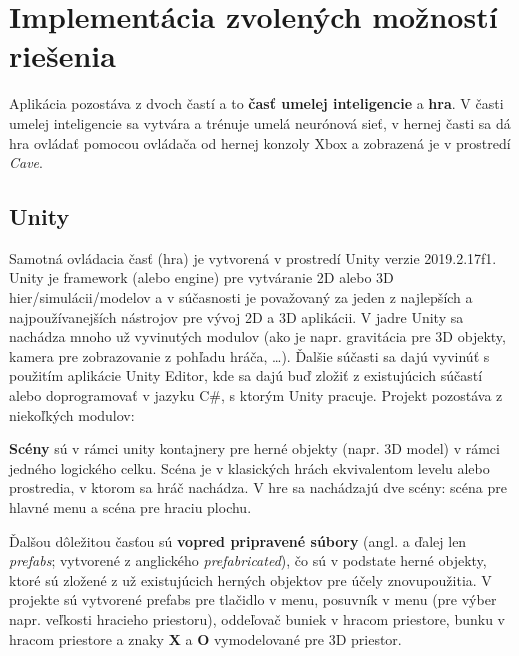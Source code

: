 \clearpage
\section{Implementácia zvolených možností riešenia}\label{sec:programming}

Aplikácia pozostáva z dvoch častí a to \textbf{časť umelej inteligencie} a \textbf{hra}.
V časti umelej inteligencie sa vytvára a trénuje umelá neurónová sieť, v hernej časti sa dá hra ovládať pomocou
ovládača od hernej konzoly Xbox a zobrazená je v prostredí \emph{Cave}.

\subsection{Unity}\label{subsec:unity}
Samotná ovládacia časť (hra) je vytvorená v prostredí Unity verzie 2019.2.17f1.
Unity je framework (alebo engine) pre vytváranie 2D alebo 3D hier/simulácii/modelov a v súčasnosti je považovaný za
jeden z najlepších a najpoužívanejších nástrojov pre vývoj 2D a 3D aplikácii.
V jadre Unity sa nachádza mnoho už vyvinutých modulov (ako je napr. gravitácia pre 3D objekty, kamera pre zobrazovanie
z pohľadu hráča, \dots).
Ďalšie súčasti sa dajú vyvinúť s použitím aplikácie Unity Editor, kde sa dajú buď zložiť z existujúcich súčastí
alebo doprogramovať v jazyku C\#, s ktorým Unity pracuje.
Projekt pozostáva z niekoľkých modulov:

\textbf{Scény} sú v rámci unity kontajnery pre herné objekty (napr. 3D model) v rámci jedného logického celku.
Scéna je v klasických hrách ekvivalentom levelu alebo prostredia, v ktorom sa hráč nachádza.
V hre sa nachádzajú dve scény: scéna pre hlavné menu a scéna pre hraciu plochu.

Ďalšou dôležitou časťou sú \textbf{vopred pripravené súbory} (angl. a ďalej len \emph{prefabs}; vytvorené z anglického
\emph{prefabricated}), čo sú v podstate herné objekty, ktoré sú zložené z už existujúcich herných objektov pre účely
znovupoužitia.
V projekte sú vytvorené prefabs pre tlačidlo v menu, posuvník v menu (pre výber napr. veľkosti hracieho priestoru),
oddeľovač buniek v hracom priestore, bunku v hracom priestore a znaky \textbf{X} a \textbf{O} vymodelované pre 3D
priestor.

